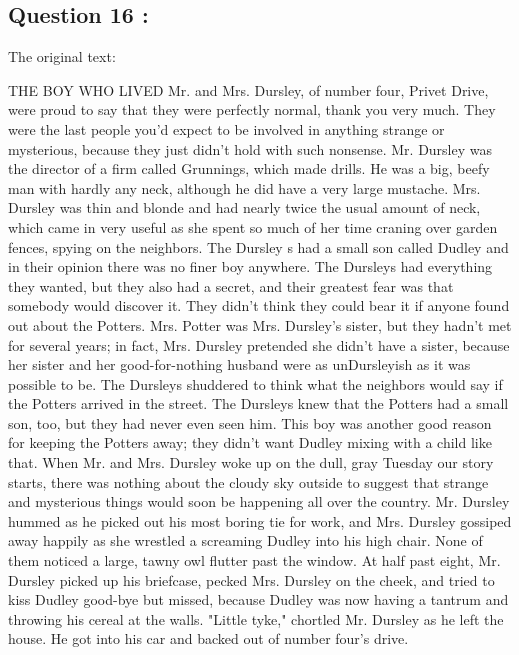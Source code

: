 \documentclass[titlepage]{article}
\begin{document}
\subsection{Question 16 : }

The original text:

\begin{displayquote}
    THE BOY WHO LIVED Mr. and Mrs. Dursley, of number four, Privet Drive, were proud to say that they were perfectly normal, thank you very much. They were the last people you'd expect to be involved in anything strange or mysterious, because they just didn't hold with such nonsense. Mr. Dursley was the director of a firm called Grunnings, which made drills. He was a big, beefy man with hardly any neck, although he did have a very large mustache. Mrs. Dursley was thin and blonde and had nearly twice the usual amount of neck, which came in very useful as she spent so much of her time craning over garden fences, spying on the neighbors. The Dursley s had a small son called Dudley and in their opinion there was no finer boy anywhere. The Dursleys had everything they wanted, but they also had a secret, and their greatest fear was that somebody would discover it. They didn't think they could bear it if anyone found out about the Potters. Mrs. Potter was Mrs. Dursley's sister, but they hadn't met for several years; in fact, Mrs. Dursley pretended she didn't have a sister, because her sister and her good-for-nothing husband were as unDursleyish as it was possible to be. The Dursleys shuddered to think what the neighbors would say if the Potters arrived in the street. The Dursleys knew that the Potters had a small son, too, but they had never even seen him. This boy was another good reason for keeping the Potters away; they didn't want Dudley mixing with a child like that. When Mr. and Mrs. Dursley woke up on the dull, gray Tuesday our story starts, there was nothing about the cloudy sky outside to suggest that strange and mysterious things would soon be happening all over the country. Mr. Dursley hummed as he picked out his most boring tie for work, and Mrs. Dursley gossiped away happily as she wrestled a screaming Dudley into his high chair. None of them noticed a large, tawny owl flutter past the window. At half past eight, Mr. Dursley picked up his briefcase, pecked Mrs. Dursley on the cheek, and tried to kiss Dudley good-bye but missed, because Dudley was now having a tantrum and throwing his cereal at the walls. "Little tyke," chortled Mr. Dursley as he left the house. He got into his car and backed out of number four's drive.
\end{displayquote}
\end{document}
